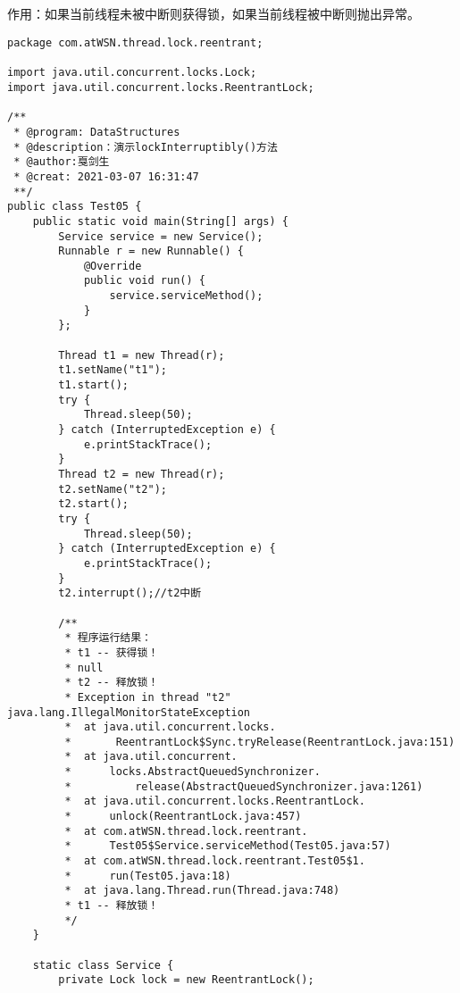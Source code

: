 \documentclass[a4paper]{report}
\begin{document}
\subsection{}
作用：如果当前线程未被中断则获得锁，如果当前线程被中断则抛出异常。
\begin{Verbatim}[frame=single,numbersep=5pt,xleftmargin=1.5em,xrightmargin=1.5em]
package com.atWSN.thread.lock.reentrant;

import java.util.concurrent.locks.Lock;
import java.util.concurrent.locks.ReentrantLock;

/**
 * @program: DataStructures
 * @description：演示lockInterruptibly()方法
 * @author:戛剑生
 * @creat: 2021-03-07 16:31:47
 **/
public class Test05 {
    public static void main(String[] args) {
        Service service = new Service();
        Runnable r = new Runnable() {
            @Override
            public void run() {
                service.serviceMethod();
            }
        };

        Thread t1 = new Thread(r);
        t1.setName("t1");
        t1.start();
        try {
            Thread.sleep(50);
        } catch (InterruptedException e) {
            e.printStackTrace();
        }
        Thread t2 = new Thread(r);
        t2.setName("t2");
        t2.start();
        try {
            Thread.sleep(50);
        } catch (InterruptedException e) {
            e.printStackTrace();
        }
        t2.interrupt();//t2中断

        /**
         * 程序运行结果：
         * t1 -- 获得锁！
         * null
         * t2 -- 释放锁！
         * Exception in thread "t2" java.lang.IllegalMonitorStateException
         * 	at java.util.concurrent.locks.
         *       ReentrantLock$Sync.tryRelease(ReentrantLock.java:151)
         * 	at java.util.concurrent.
         *      locks.AbstractQueuedSynchronizer.
         *          release(AbstractQueuedSynchronizer.java:1261)
         * 	at java.util.concurrent.locks.ReentrantLock.
         *      unlock(ReentrantLock.java:457)
         * 	at com.atWSN.thread.lock.reentrant.
         *      Test05$Service.serviceMethod(Test05.java:57)
         * 	at com.atWSN.thread.lock.reentrant.Test05$1.
         *      run(Test05.java:18)
         * 	at java.lang.Thread.run(Thread.java:748)
         * t1 -- 释放锁！
         */
    }

    static class Service {
        private Lock lock = new ReentrantLock();


\end{Verbatim}
\end{document}
